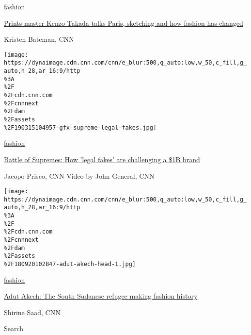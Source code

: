 \href{/style/fashion}{fashion}

\href{/style/article/kenzo-takada-interview/index.html}{Prints master
Kenzo Takada talks Paris, sketching and how fashion has changed}

Kristen Bateman, CNN

\href{/style/article/supreme-italia-legal-fake/index.html}{}

\texttt{[image: https://dynaimage.cdn.cnn.com/cnn/e\_blur:500,q\_auto:low,w\_50,c\_fill,g\_auto,h\_28,ar\_16:9/http\\\%3A\\\%2F\\\%2Fcdn.cnn.com\\\%2Fcnnnext\\\%2Fdam\\\%2Fassets\\\%2F190315104957-gfx-supreme-legal-fakes.jpg]}

\href{/style/fashion}{fashion}

\href{/style/article/supreme-italia-legal-fake/index.html}{Battle of
Supremes: How 'legal fakes' are challenging a \$1B brand}

Jacopo Prisco, CNN Video by John General, CNN

\href{/style/article/adut-akech-model-profile/index.html}{}

\texttt{[image: https://dynaimage.cdn.cnn.com/cnn/e\_blur:500,q\_auto:low,w\_50,c\_fill,g\_auto,h\_28,ar\_16:9/http\\\%3A\\\%2F\\\%2Fcdn.cnn.com\\\%2Fcnnnext\\\%2Fdam\\\%2Fassets\\\%2F180920102847-adut-akech-head-1.jpg]}

\href{/style/fashion}{fashion}

\href{/style/article/adut-akech-model-profile/index.html}{Adut Akech:
The South Sudanese refugee making fashion history}

Shirine Saad, CNN

Search

